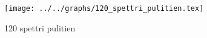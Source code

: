 \begin{figure}[h] \centering\texttt{[image: ../../graphs/120\_spettri\_pulitien.tex]}\caption{120 spettri pulitien}\label{gr:120_spettri_pulitien} \end{figure}

